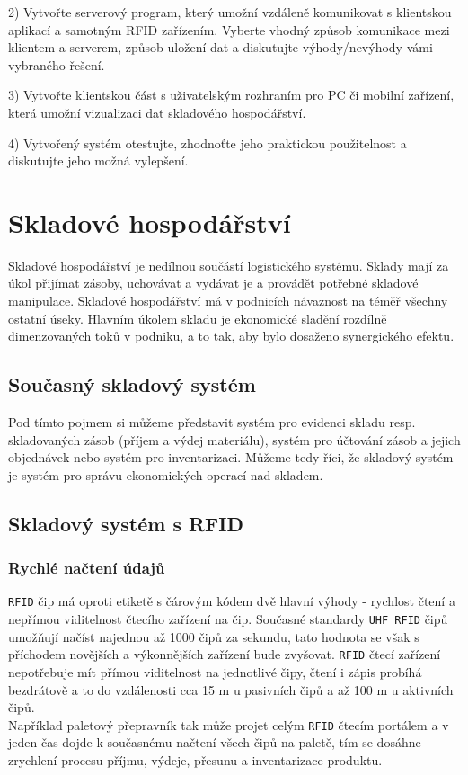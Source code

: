 \documentclass[czech,BP]{thesiskiv}
\begin{document}
2) Vytvořte serverový program, který umožní vzdáleně komunikovat s klientskou aplikací a samotným RFID zařízením.
Vyberte vhodný způsob komunikace mezi klientem a serverem, způsob uložení dat a diskutujte výhody/nevýhody vámi vybraného řešení.

3) Vytvořte klientskou část s uživatelským rozhraním pro PC či mobilní zařízení, která umožní vizualizaci dat skladového hospodářství.

4) Vytvořený systém otestujte, zhodnoťte jeho praktickou použitelnost a diskutujte jeho možná vylepšení.
\fi














	
\chapter{Skladové hospodářství}
Skladové hospodářství je nedílnou součástí logistického systému. Sklady mají za úkol přijímat zásoby, uchovávat a vydávat je a provádět potřebné skladové manipulace. Skladové hospodářství má v podnicích návaznost na téměř všechny ostatní úseky. Hlavním úkolem skladu je ekonomické sladění rozdílně dimenzovaných toků v podniku, a to tak, aby bylo dosaženo synergického efektu.\cite{vitek2007skladove}


\section{Současný skladový systém}
Pod tímto pojmem si můžeme představit systém pro evidenci skladu resp. skladovaných zásob (příjem  a  výdej  materiálu), systém pro účtování zásob a jejich objednávek nebo systém pro inventarizaci. Můžeme tedy říci, že skladový systém je systém pro správu ekonomických operací nad skladem.\cite{hron2014skladovy}


\section{Skladový systém s RFID}

\subsection{Rychlé načtení údajů}
\texttt{RFID} čip má oproti etiketě s čárovým kódem dvě hlavní výhody - rychlost čtení a nepřímou viditelnost čtecího zařízení na čip. Současné standardy \texttt{UHF RFID} čipů umožňují načíst najednou až 1000 čipů za sekundu, tato hodnota se však s příchodem novějších a výkonnějších zařízení bude zvyšovat. \texttt{RFID} čtecí zařízení nepotřebuje mít přímou viditelnost na jednotlivé čipy, čtení i zápis probíhá bezdrátově a to do vzdálenosti cca 15 m u pasivních čipů a až 100 m u aktivních čipů.\cite{dolevcek2010identifikace}
\\
Například paletový přepravník tak může projet celým \texttt{RFID} čtecím portálem a v jeden čas dojde k současnému načtení všech čipů na paletě, tím se dosáhne zrychlení procesu příjmu, výdeje, přesunu a inventarizace produktu.\cite{dolevcek2010identifikace}
\end{document}
